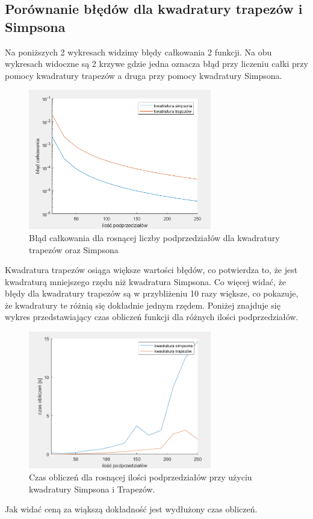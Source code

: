 \documentclass[12pt]{article}
\begin{document}
\subsection{Por\'ownanie b\l ęd\'ow dla kwadratury trapez\'ow i Simpsona}
Na poni\.zszych 2 wykresach widzimy b\l ędy ca\l kowania 2 funkcji. 
Na obu wykresach widoczne są 2 krzywe gdzie jedna oznacza b\l ąd przy liczeniu 
ca\l ki przy pomocy kwadratury trapez\'ow a druga przy pomocy kwadratury Simpsona.

\begin{figure}[H]
    \centering
    \includegraphics[width=8cm]{trapez_vs_simpson.png}
    \caption{B\l ąd ca\l kowania dla rosnącej liczby podprzedzia\l \'ow
    dla kwadratury trapez\'ow oraz Simpsona}
\end{figure}
Kwadratura trapez\'ow osiąga większe warto\'sci b\l ęd\'ow, co potwierdza to,
\.ze jest kwadraturą mniejszego rzędu ni\.z kwadratura Simpsona. Co więcej
wida\'c, \.ze b\l ędy dla kwadratury trapez\'ow są w przybli\.zeniu 10 razy 
większe, co pokazuje, \.ze kwadratury te r\'o\.znią się dok\l adnie jednym
rzędem. Poni\.zej znajduje się wykres przedstawiający czas oblicze\'n
funkcji dla r\'o\.znych ilo\'sci podprzedzia\l \'ow.
\begin{figure}[H]
    \centering
    \includegraphics[width=8cm]{time.png}
    \caption{Czas oblicze\'n dla rosnącej ilo\'sci podprzedzia\l \'ow
    przy u\.zyciu kwadratury Simpsona i Trapez\'ow.}
\end{figure}
Jak wida\'c ceną za wiąkszą dok\l adno\'s\'c jest wyd\l u\.zony czas oblicze\'n.
\end{document}
